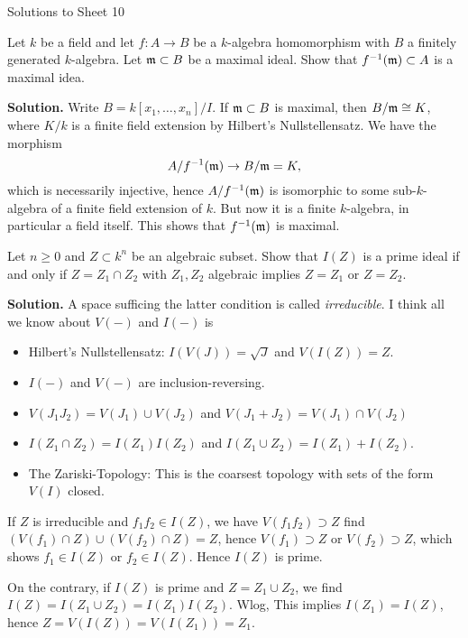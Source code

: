 \documentclass[a4paper,11pt]{article}
\begin{document}
\begin{center}
    \huge{Solutions to Sheet 10}
\end{center}

Let $k$ be a field and let $f: A\to B$ be a $k$-algebra homomorphism
with $B$ a finitely generated $k$-algebra. Let $\mathfrak{m} \subset B$ be 
a maximal ideal. Show that $f^{-1}(\mathfrak{m}) \subset A$ is a maximal idea.

\textbf{Solution.} Write $B = k[x_1, \dots, x_n]/I$. If $\mathfrak{m} \subset B$
is maximal, then $B/\mathfrak{m} \cong K$, where $K/k$ is a finite field extension 
by Hilbert's Nullstellensatz. We have the morphism
\begin{equation*}
    A/f^{-1}(\mathfrak{m}) \to B/\mathfrak{m} = K,
\end{equation*}
which is necessarily injective, hence $A/f^{-1}(\mathfrak{m})$ is isomorphic to some 
sub-$k$-algebra of a finite field extension of $k$. But now it is a finite
$k$-algebra, in particular a field itself. This shows that $f^{-1}(\mathfrak{m})$ 
is maximal.


Let $n \geq 0$ and $Z \subset k^n$ be an algebraic subset. Show that $I(Z)$
is a prime ideal if and only if $Z = Z_1 \cap Z_2$ with $Z_1, Z_2$ 
algebraic implies $Z = Z_1$ or $Z = Z_2$. 

\textbf{Solution.} A space sufficing the latter condition is called
\textit{irreducible}. I think all we know about $V(-)$ and 
$I(-)$ is
\begin{itemize}
    \item Hilbert's Nullstellensatz: $I(V(J)) = \sqrt J$ and $V(I(Z)) = Z$. 
    \item $I(-)$ and $V(-)$ are inclusion-reversing.
    \item $V(J_1J_2) = V(J_1) \cup V(J_2)$ and $V(J_1 + J_2) = 
        V(J_1) \cap V(J_2)$
    \item $I(Z_1 \cap Z_2) = I(Z_1)I(Z_2)$ and $I(Z_1 \cup Z_2) = I(Z_1) + I(Z_2)$.
    \item The Zariski-Topology: This is the coarsest topology with sets of
        the form $V(I)$ closed. 
\end{itemize}

If $Z$ is irreducible and $f_1 f_2 \in I(Z)$,
we have $V(f_1 f_2) \supset Z$ find $( V(f_1) \cap Z ) \cup ( V(f_2) \cap Z ) =
Z$, hence $V(f_1) \supset Z$ or $V(f_2) \supset Z$, which shows 
$f_1 \in I(Z)$ or $f_2 \in I(Z)$. Hence $I(Z)$ is prime. 

On the contrary, if $I(Z)$ is prime and $Z = Z_1 \cup Z_2$, we find 
$I(Z) = I(Z_1 \cup Z_2) = I(Z_1) I(Z_2)$. Wlog, This implies $I(Z_1) = I(Z)$,
hence $Z = V(I(Z)) = V(I(Z_1)) = Z_1$.
\end{document}

